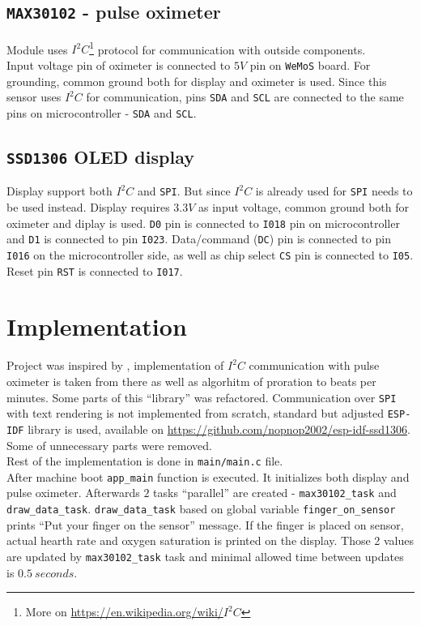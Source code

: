     \section{\texttt{MAX30102} - pulse oximeter}
    \label{max30102}
        Module uses \texttt{$I^2C$}\footnote{More on \href{https://en.wikipedia.org/wiki/I\%C2\%B2C}{https://en.wikipedia.org/wiki/\texttt{$I^2C$}}} protocol for communication with outside components. \\
        Input voltage pin of oximeter is connected to $5V$ pin on \texttt{WeMoS} board. For grounding, common ground both for display and oximeter is used. Since this sensor uses \texttt{$I^2C$} for communication, pins \texttt{SDA} and \texttt{SCL} are connected to the same pins on microcontroller - \texttt{SDA} and \texttt{SCL}.
    \section{\texttt{SSD1306} OLED display}
        Display support both \texttt{$I^2C$} and \texttt{SPI}. But since \texttt{$I^2C$} is already used for  \texttt{SPI} needs to be used instead. Display requires $3.3V$ as input voltage, common ground both for oximeter and diplay is used. \texttt{D0} pin is connected to \texttt{I018} pin on microcontroller and \texttt{D1} is connected to pin \texttt{I023}. Data/command (\texttt{DC}) pin is connected to pin \texttt{I016} on the microcontroller side, as well as chip select \texttt{CS} pin is connected to \texttt{I05}. Reset pin \texttt{RST} is connected to \texttt{I017}.
   
\chapter{Implementation}
    Project was inspired by \cite{hackerio}, implementation of \texttt{$I^2C$} communication with pulse oximeter is taken from there as well as algorhitm of proration to beats per minutes. Some parts of this ``library'' was refactored.
    Communication over \texttt{SPI} with text rendering is not implemented from scratch, standard but adjusted \texttt{ESP-IDF} library is used, available on \href{https://github.com/nopnop2002/esp-idf-ssd1306}{https://github.com/nopnop2002/esp-idf-ssd1306}. Some of unnecessary parts were removed.\\
    Rest of the implementation is done in \texttt{main/main.c} file. \\
    

    After machine boot \texttt{app\_main} function is executed. It initializes both display and pulse oximeter. Afterwards $2$ tasks ``parallel'' are created - \texttt{max30102\_task} and \texttt{draw\_data\_task}.
    \texttt{draw\_data\_task} based on global variable \texttt{finger\_on\_sensor} prints ``Put your finger on the sensor'' message. If the finger is placed on sensor, actual hearth rate and oxygen saturation is printed on the display. Those 2 values are updated by \texttt{max30102\_task} task and minimal allowed time between updates is $0.5\ seconds$.

